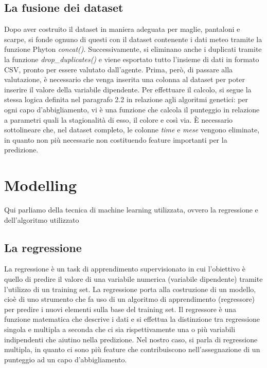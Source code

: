 \documentclass[a4paper, 11pt, oneside]{report}
\begin{document}
                \subsection{La fusione dei dataset}
                Dopo aver costruito il dataset in maniera adeguata per maglie, pantaloni e scarpe, si fonde ognuno di
                questi con il dataset contenente i dati meteo tramite la funzione Phyton \textit{concat()}. Successivamente,
                si eliminano anche i duplicati tramite la funzione \textit{drop\_duplicates()} e viene esportato tutto
                l'insieme di dati in formato CSV, pronto per essere valutato dall'agente. Prima, però, di passare alla valutazione,
                è necessario che venga inserita una colonna al dataset per poter inserire il valore della variabile dipendente.
                Per effettuare il calcolo, si segue la stessa logica definita nel paragrafo 2.2 in relazione agli algoritmi genetici:
                per ogni capo d'abbigliamento, vi è una funzione che calcola il punteggio in relazione a parametri quali la stagionalità
                di esso, il colore e così via.  \`E necessario sottolineare che, nel dataset completo, le colonne \textit{time}
                e \textit{mese} vengono eliminate, in quanto non più necessarie non costituendo feature importanti per la predizione.

            \newpage
            \section{Modelling}
            Qui parliamo della tecnica di machine learning utilizzata, ovvero la regressione e dell'algoritmo utilizzato
                \subsection{La regressione}
                La regressione è un task di apprendimento supervisionato in cui l'obiettivo è quello di predire il valore
                di una variabile numerica (variabile dipendente) tramite l'utilizzo di un training set. La regressione
                porta alla costruzione di un modello, cioè di uno strumento che fa uso di un algoritmo di apprendimento
                (regressore) per predire i nuovi elementi sulla base del training set. Il regressore è una funzione matematica
                che descrive i dati e si effettua la distinzione tra regressione singola e multipla a seconda che ci sia
                rispettivamente una o più variabili indipendenti che aiutino nella predizione. Nel nostro caso, si parla di
                regressione multipla, in quanto ci sono più feature che contribuiscono nell'assegnazione di un punteggio ad
                un capo d'abbigliamento.
\end{document}
